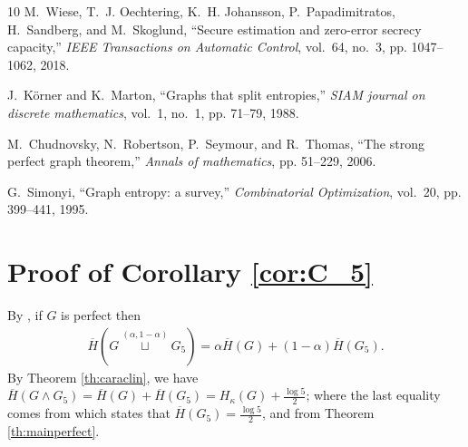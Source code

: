 \documentclass[conference,a4paper]{IEEEtran}
\begin{document}
\begin{thebibliography}{10}
M.~Wiese, T.~J. Oechtering, K.~H. Johansson, P.~Papadimitratos, H.~Sandberg,
  and M.~Skoglund, ``Secure estimation and zero-error secrecy capacity,''
  \emph{IEEE Transactions on Automatic Control}, vol.~64, no.~3, pp.
  1047--1062, 2018.

J.~K{\"o}rner and K.~Marton, ``Graphs that split entropies,'' \emph{SIAM
  journal on discrete mathematics}, vol.~1, no.~1, pp. 71--79, 1988.

M.~Chudnovsky, N.~Robertson, P.~Seymour, and R.~Thomas, ``The strong perfect
  graph theorem,'' \emph{Annals of mathematics}, pp. 51--229, 2006.

G.~Simonyi, ``Graph entropy: a survey,'' \emph{Combinatorial Optimization},
  vol.~20, pp. 399--441, 1995.

\end{thebibliography}

%
%

\appendices

\section{Proof of Corollary \ref{cor:C_5}}\label{section:proofcorC_5}

By \cite[Lemma 3]{tuncel2009complementary}, if $G$ is perfect then 
\begin{align}
    \overline{H}(G \overset{(\alpha, 1-\alpha)}{\sqcup} G_5) = \alpha \overline{H}(G) + (1-\alpha)\overline{H}(G_5).
\end{align}
By Theorem \ref{th:caraclin}, we have $\overline{H}(G \wedge G_5) = \overline{H}(G) + \overline{H}(G_5) = H_\kappa(G) + \frac{\log 5}{2}$; where the last equality comes from \cite[Example 1]{koulgi2003zero} which states that $\overline{H}(G_5) = \frac{\log 5}{2}$, and from Theorem \ref{th:mainperfect}.
\end{document}
